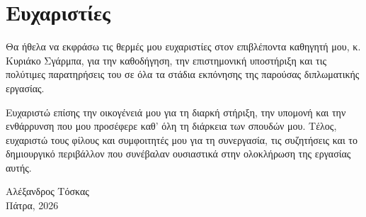 
\chapter*{Ευχαριστίες}

Θα ήθελα να εκφράσω τις θερμές μου ευχαριστίες στον επιβλέποντα καθηγητή μου, κ. Κυριάκο Σγάρμπα, για την καθοδήγηση, την επιστημονική υποστήριξη και τις πολύτιμες παρατηρήσεις του σε όλα τα στάδια εκπόνησης της παρούσας διπλωματικής εργασίας.

Ευχαριστώ επίσης την οικογένειά μου για τη διαρκή στήριξη, την υπομονή και την ενθάρρυνση που μου προσέφερε καθ' όλη τη διάρκεια των σπουδών μου. Τέλος, ευχαριστώ τους φίλους και συμφοιτητές μου για τη συνεργασία, τις συζητήσεις και το δημιουργικό περιβάλλον που συνέβαλαν ουσιαστικά στην ολοκλήρωση της εργασίας αυτής.

\vspace{2cm}

\begin{flushright}
Αλέξανδρος Τόσκας\\
Πάτρα, 2026
\end{flushright}
